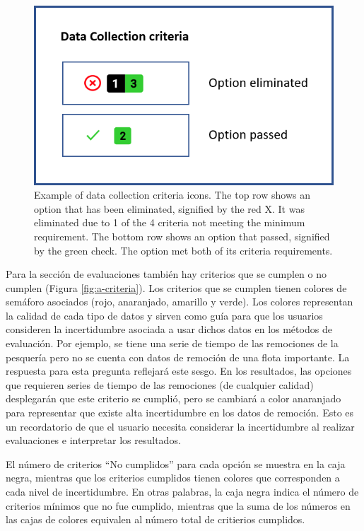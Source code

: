\documentclass[
  11pt,
]{book}
\begin{document}
\begin{figure}

{\centering \includegraphics[width=0.35\linewidth]{images/dc-criteria} 

}

\caption{Example of data collection criteria icons. The top row shows an option that has been eliminated, signified by the red X. It was eliminated due to 1 of the 4 criteria not meeting the minimum requirement. The bottom row shows an option that passed, signified by the green check. The option met both of its criteria requirements.}\label{fig:dc-criteria}
\end{figure}

Para la sección de evaluaciones también hay criterios que se cumplen o no cumplen (Figura \ref{fig:a-criteria}). Los criterios que se cumplen tienen colores de semáforo asociados (rojo, anaranjado, amarillo y verde). Los colores representan la calidad de cada tipo de datos y sirven como guía para que los usuarios consideren la incertidumbre asociada a usar dichos datos en los métodos de evaluación. Por ejemplo, se tiene una serie de tiempo de las remociones de la pesquería pero no se cuenta con datos de remoción de una flota importante. La respuesta para esta pregunta reflejará este sesgo. En los resultados, las opciones que requieren series de tiempo de las remociones (de cualquier calidad) desplegarán que este criterio se cumplió, pero se cambiará a color anaranjado para representar que existe alta incertidumbre en los datos de remoción. Esto es un recordatorio de que el usuario necesita considerar la incertidumbre al realizar evaluaciones e interpretar los resultados.

El número de criterios ``No cumplidos'' para cada opción se muestra en la caja negra, mientras que los criterios cumplidos tienen colores que corresponden a cada nivel de incertidumbre. En otras palabras, la caja negra indica el número de criterios mínimos que no fue cumplido, mientras que la suma de los números en las cajas de colores equivalen al número total de critierios cumplidos.
\end{document}
